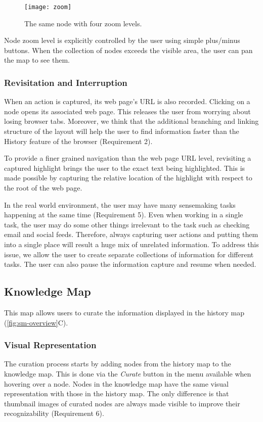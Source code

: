 \begin{figure}[!htb]
	\centering
	\texttt{[image: zoom]}
	\caption{The same node with four zoom levels.}
	\label{fig:zoom}
\end{figure}

Node zoom level is explicitly controlled by the user using simple plus/minus buttons. When the collection of nodes exceeds the visible area, the user can pan the map to see them.

\subsubsection{Revisitation and Interruption}
When an action is captured, its web page's URL is also recorded. Clicking on a node opens its associated web page. This releases the user from worrying about losing browser tabs. Moreover, we think that the additional branching and linking structure of the layout will help the user to find information faster than the History feature of the browser (Requirement 2).

To provide a finer grained navigation than the web page URL level, revisiting a captured highlight brings the user to the exact text being highlighted. This is made possible by capturing the relative location of the highlight with respect to the root of the web page.

In the real world environment, the user may have many sensemaking tasks happening at the same time (Requirement 5). Even when working in a single task, the user may do some other things irrelevant to the task such as checking email and social feeds. Therefore, always capturing user actions and putting them into a single place will result a huge mix of unrelated information. To address this issue, we allow the user to create separate collections of information for different tasks. The user can also pause the information capture and resume when needed.

\subsection{Knowledge Map}
This map allows users to curate the information displayed in the history map (\autoref{fig:sm-overview}C).

\subsubsection{Visual Representation}
The curation process starts by adding nodes from the history map to the knowledge map. This is done via the \textit{Curate} button in the menu available when hovering over a node. Nodes in the knowledge map have the same visual representation with those in the history map. The only difference is that thumbnail images of curated nodes are always made visible to improve their recognizability (Requirement 6).

